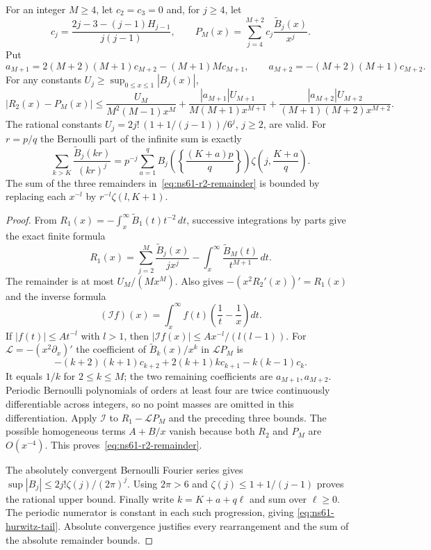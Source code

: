 \begin{lemma}
\label{lem:ns61-r2-tail}
For an integer $M\geq4$, let $c_2=c_3=0$ and, for $j\geq4$, let
\[
 c_j=\frac{2j-3-(j-1)H_{j-1}}{j(j-1)},\qquad
 P_M(x)=\sum_{j=4}^{M+2}c_j\frac{\widetilde B_j(x)}{x^j}.
\]
Put
\[
 a_{M+1}=2(M+2)(M+1)c_{M+2}-(M+1)Mc_{M+1},\qquad
 a_{M+2}=-(M+2)(M+1)c_{M+2}.
\]
For any constants $U_j\geq\sup_{0\leq x\leq1}|B_j(x)|$,
\begin{equation}
 |R_2(x)-P_M(x)|\leq
 \frac{U_M}{M^2(M-1)x^M}
 +\frac{|a_{M+1}|U_{M+1}}{M(M+1)x^{M+1}}
 +\frac{|a_{M+2}|U_{M+2}}{(M+1)(M+2)x^{M+2}}.
 \label{eq:ns61-r2-remainder}
\end{equation}
The rational constants
$U_j=2j!\,(1+1/(j-1))/6^j$, $j\geq2$, are valid.
For $r=p/q$ the Bernoulli part of the infinite sum is exactly
\begin{equation}
 \sum_{k>K}\frac{\widetilde B_j(kr)}{(kr)^j}
 =p^{-j}\sum_{a=1}^{q}
 B_j\left(\left\{\frac{(K+a)p}{q}\right\}\right)
 \zeta\left(j,\frac{K+a}{q}\right).
 \label{eq:ns61-hurwitz-tail}
\end{equation}
The sum of the three remainders in~\eqref{eq:ns61-r2-remainder}
is bounded by replacing each $x^{-l}$ by
$r^{-l}\zeta(l,K+1)$.
\end{lemma}
\begin{proof}
From $R_1(x)=-\int_x^\infty\widetilde B_1(t)t^{-2}\,dt$,
successive integrations by parts give the exact finite formula
\[
 R_1(x)=\sum_{j=2}^{M}\frac{\widetilde B_j(x)}{jx^j}
            -\int_x^\infty\frac{\widetilde B_M(t)}{t^{M+1}}\,dt.
\]
The remainder is at most $U_M/(Mx^M)$. Also
\cite[Proposition 5.2, Eq. (40)]{Ehm2024} gives
$-(x^2R_2'(x))'=R_1(x)$ and the inverse formula
\[
 (\mathcal If)(x)=\int_x^\infty f(t)\left(\frac1t-\frac1x\right)dt.
\]
If $|f(t)|\leq At^{-l}$ with $l>1$, then
$|\mathcal If(x)|\leq A x^{-l}/(l(l-1))$.
For $\mathcal L=-(x^2\partial_x)'$ the coefficient of
$\widetilde B_k(x)/x^k$ in $\mathcal LP_M$ is
\[
 -(k+2)(k+1)c_{k+2}+2(k+1)kc_{k+1}-k(k-1)c_k.
\]
It equals $1/k$ for $2\leq k\leq M$; the two remaining coefficients
are $a_{M+1},a_{M+2}$. Periodic Bernoulli polynomials of orders at
least four are twice continuously differentiable across integers, so
no point masses are omitted in this differentiation. Apply
$\mathcal I$ to $R_1-\mathcal LP_M$ and the preceding three bounds.
The possible homogeneous terms $A+B/x$ vanish because both $R_2$
and $P_M$ are $O(x^{-4})$. This proves~\eqref{eq:ns61-r2-remainder}.

The absolutely convergent Bernoulli Fourier series
\cite[Eq. (24.8.3)]{DLMFBernoulliFourier} gives
$\sup|B_j|\leq2j!\zeta(j)/(2\pi)^j$.
Using $2\pi>6$ and $\zeta(j)\leq1+1/(j-1)$ proves the rational
upper bound. Finally write $k=K+a+q\ell$ and sum over $\ell\geq0$.
The periodic numerator is constant in each such progression, giving
\eqref{eq:ns61-hurwitz-tail}. Absolute convergence justifies every
rearrangement and the sum of the absolute remainder bounds.
\end{proof}


